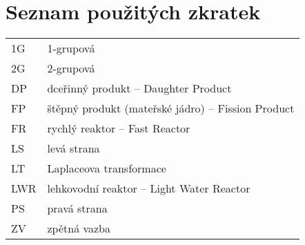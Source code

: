 \section*{Seznam použitých zkratek}

\renewcommand{\arraystretch}{1.2}
\begin{table}[H]
\begin{tabular}{p{1cm}l}
  1G           & 1-grupová \\
  2G           & 2-grupová \\
  DP           & dceřinný produkt -- Daughter Product \\
  FP           & štěpný produkt (mateřské jádro) -- Fission Product \\
  FR           & rychlý reaktor -- Fast Reactor \\
  LS           & levá strana \\
  LT           & Laplaceova transformace \\
  LWR          & lehkovodní reaktor -- Light Water Reactor \\
  PS           & pravá strana \\
  ZV           & zpětná vazba \\
\end{tabular}
\end{table}
\renewcommand{\arraystretch}{1}
